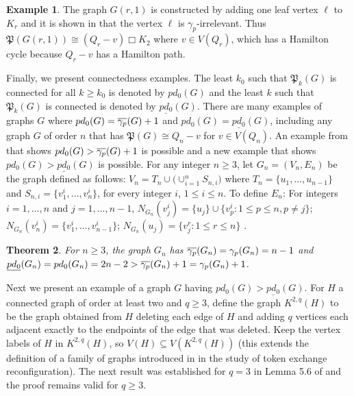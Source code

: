 \documentclass{article}
\numberwithin{figure}{section}
\numberwithin{table}{section}
\numberwithin{equation}{section}
\newtheorem{thm}{Theorem}[section]
\theoremstyle{definition}
\theoremstyle{definition}
\theoremstyle{definition}
\newtheorem{ex}[thm]{Example}
\newcommand{\pd}{\gamma_p}
\newcommand{\pdtar}{\mathfrak{P}}%
\newcommand{\pdo}{pd_0}
\newcommand{\ulpdo}{\underline{pd_0}}
\begin{document}
{\begin{ex}
The graph $G(r,1)$ is constructed by adding one leaf  vertex $\ell$ to $K_r$ %
and it is   shown in \cite[Proposition 2.16]{XTARiso} that the vertex $\ell$ is $\pd$-irrelevant. Thus $\pdtar(G(r,1))\cong (Q_r-v)\Box K_2$ where $v\in V(Q_r)$, which has a Hamilton cycle because $Q_r-v$ has a Hamilton path.
\end{ex}


  

Finally, we  present connectedness examples.  The least $k_0$ such that $\pdtar_k(G)$ is connected for all $k\ge k_0$ is denoted by $\pdo(G)$  and the least $k$ such that $\pdtar_k(G)$ is connected is denoted by $\ulpdo(G)$. There are many examples of graphs $G$ where $\pdo(G)=\pdbar(G)+1$ and $\pdo(G)=\ulpdo(G)$, including any graph $G$ of order $n$ that has $\pdtar(G)\cong Q_n-v$  for  $v\in V(Q_n)$. An example from \cite{PDrecon} that shows $\pdo(G)>\pdbar(G)+1$ is possible and a new example that shows $\pdo(G)>\ulpdo(G)$ is possible.  
For any integer $n\geq 3$, let $G_n=(V_n,E_n)$ be the graph defined as follows:
 $V_n=T_n\cup \big( \cup_{i=1}^n S_{n,i}\big)$ where $T_n=\{u_1,\ldots, u_{n-1}\}$ and $S_{n,i}=\{v^i_1,\ldots , v^i_n\}$, for every integer $i$,  $1\leq i\leq n$.
To define $E_n$: For integers $i=1,\ldots, n$ and $j=1,\ldots , n-1$, $N_{G_n}(v^i_j)=\{u_j\}\cup \{v^i_p: 1\leq p\leq n, p\not=j\}$; $N_{G_n}(v^i_n)=\{v^i_1,\ldots , v^i_{n-1}\}$; $N_{G_n}(u_j)=\{v^r_j: 1\leq r\leq n\}$ \cite[Definition 3.11]{PDrecon}.

\begin{thm}{\rm\cite[Theorem 3.12]{PDrecon}}
For $n\ge 3$, the graph $G_n$ has $\pdbar(G_n)=\pd(G_n)=n-1$ and $\ulpdo(G_n)=\pdo(G_n)=2n-2>\pdbar(G_n)+1=\pd(G_n)+1$.
\end{thm}




  Next we present an example of a graph $G$ having $\pdo(G)>\ulpdo(G)$.
For $H$ a   connected graph of order at least two and $q\ge 3$, define the graph $K^{2,q}(H)$ to be the graph obtained from $H$  deleting each edge of $H$  and adding $q$ vertices each adjacent exactly to the endpoints of the edge that was deleted.  Keep the vertex labels of $H$ in $K^{2,q}(H)$, so $V(H)\subseteq V(K^{2,q}(H))$ (this extends the definition of  a family of graphs introduced in \cite{PDrecon} in the study  of token exchange reconfiguration). 
The  next result was established for $q=3$ in Lemma 5.6 of \cite{PDrecon} and the proof remains valid for $q\ge 3$.

}
\end{document}
